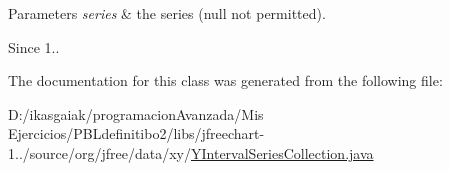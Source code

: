 \begin{DoxyParams}{Parameters}
{\em series} & the series ({\ttfamily null} not permitted).\\
\hline
\end{DoxyParams}
\begin{DoxySince}{Since}
1.. 
\end{DoxySince}


The documentation for this class was generated from the following file\+:\begin{DoxyCompactItemize}
\item 
D\+:/ikasgaiak/programacion\+Avanzada/\+Mis Ejercicios/\+P\+B\+Ldefinitibo2/libs/jfreechart-\/1../source/org/jfree/data/xy/\mbox{\hyperlink{_y_interval_series_collection_8java}{Y\+Interval\+Series\+Collection.\+java}}\end{DoxyCompactItemize}
